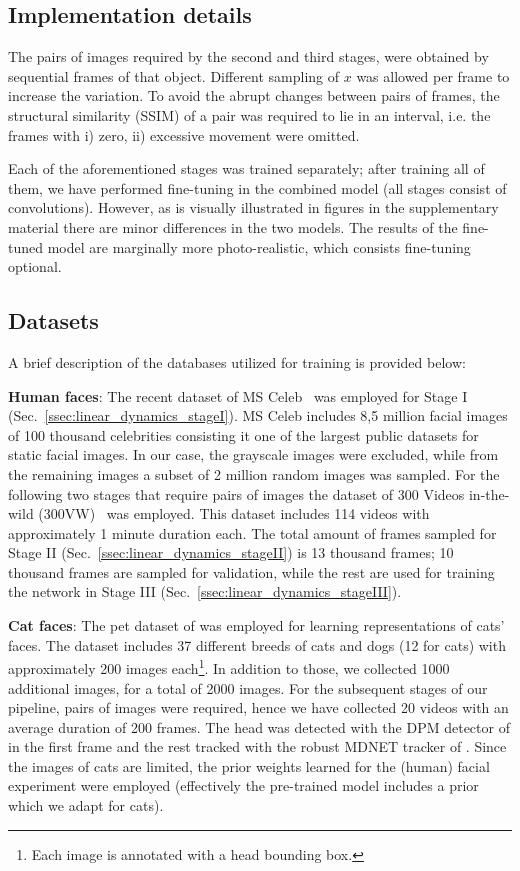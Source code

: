 \documentclass[10pt,twocolumn,letterpaper]{article}
\begin{document}
\subsection{Implementation details}
The pairs of images required by the second and third stages, were obtained by sequential frames of that object. Different sampling of $x$ was allowed per frame to increase the variation. To avoid the abrupt changes between pairs of frames, the structural similarity (SSIM) of a pair was required to lie in an interval, i.e. the frames with i) zero, ii) excessive movement were omitted. 

Each of the aforementioned stages was trained separately; after training all of them, we have performed fine-tuning in the combined model (all stages consist of convolutions). However, as is visually illustrated in figures in the supplementary material there are minor differences in the two models. The results of the fine-tuned model are marginally more photo-realistic, which consists fine-tuning optional.

\subsection{Datasets}\label{ssec:linear_dynamics_dataset}
A brief description of the databases utilized for training is provided below: 

\textbf{Human faces}: The recent dataset of MS Celeb~\cite{guo2016ms} was employed for Stage I (Sec.~\ref{ssec:linear_dynamics_stageI}). MS Celeb includes 8,5 million facial images of 100 thousand celebrities consisting it one of the largest public datasets for static facial images. In our case, the grayscale images were excluded, while from the remaining images a subset of 2 million random images was sampled. For the following two stages that require pairs of images the dataset of 300 Videos in-the-wild (300VW)~\cite{shen2015first} was employed. This dataset includes 114 videos with approximately 1 minute duration each. The total amount of frames sampled for Stage II  (Sec.~\ref{ssec:linear_dynamics_stageII}) is 13 thousand frames; 10 thousand frames are sampled for validation, while the rest are used for training the network in Stage III (Sec.~\ref{ssec:linear_dynamics_stageIII}).  

\textbf{Cat faces}: The pet dataset of \cite{parkhi2012cats} was employed for learning representations of cats' faces. The dataset includes 37 different breeds of cats and dogs (12 for cats) with approximately 200 images each\footnote{Each image is annotated with a head bounding box.}. In addition to those, we collected 1000 additional images, for a total of 2000 images. For the subsequent stages of our pipeline, pairs of images were required, hence we have collected 20 videos with an average duration of 200 frames. The head was detected with the DPM detector of \cite{felzenszwalb2010object} in the first frame and the rest tracked with the robust MDNET tracker of \cite{nam2016mdnet}. Since the images of cats are limited, the prior weights learned for the (human) facial experiment were employed (effectively the pre-trained model includes a prior which we adapt for cats).
\end{document}
